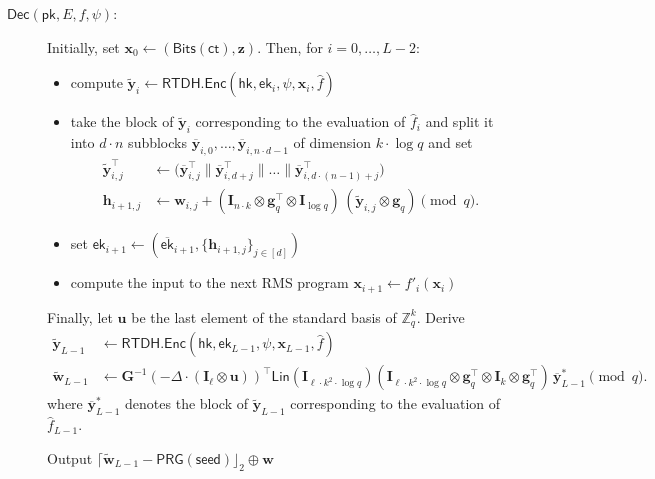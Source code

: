 \documentclass{theoretics}
\newcommand{\ek}{\mathsf{ek}}
\newcommand{\Z}{\mathbb{Z}}
\newcommand{\ct}{\mathsf{ct}}
\newcommand{\RTDH}{\mathsf{RTDH}}
\newcommand{\algofont}[1]{\ensuremath{\mathsf{#1}}}
\newcommand{\Enc}{{\algofont{Enc}}}
\newcommand{\Dec}{{\algofont{Dec}}}
\newcommand{\id}{\ensuremath{\mathbf{I}}}
\newcommand{\pk}{{\mathsf{pk}}}
\newcommand{\hk}{\ensuremath{\mathsf{hk}}}
\newenvironment{protocol}[1][]
{\begin{algorithm}\caption{#1}}
  {\end{algorithm}}
\begin{document}
\begin{protocol}[(cont.)]
\begin{description}
\item[$\Dec(\pk, E, f, \psi)$:]
Initially, set $\mathbf{x}_0\gets (\mathsf{Bits}(\ct), \mathbf{z})$.
Then, for $i=0, \dots, L-2$: 
\begin{itemize}
\item compute $\tilde{\mathbf{y}}_i\gets\RTDH.\Enc(\hk, \ek_i, \psi, \mathbf{x}_i, \hat{f})$
\item take the block of $\tilde{\mathbf{y}}_{i}$ corresponding to the evaluation of $\hat{f}_i$ and split it into $d\cdot n$ subblocks $\overline{\mathbf{y}}_{i, 0}, \dots, \overline{\mathbf{y}}_{i, n\cdot d-1}$ of dimension $k\cdot \log q$ and set
\begin{align*}
\tilde{\mathbf{y}}_{i, j}^\intercal&\gets \bigl(\overline{\mathbf{y}}_{i, j}^\intercal \mathbin{\|} \overline{\mathbf{y}}_{i, d+j}^\intercal \mathbin{\|}\dots \mathbin{\|} \overline{\mathbf{y}}_{i, d\cdot (n-1)+j}^\intercal\bigr)\\
\mathbf{h}_{i+1,j}&\gets \mathbf{w}_{i,j} +(\id_{n\cdot k}\otimes \mathbf{g}_q^\intercal\otimes \id_{\log q})\,(\tilde{\mathbf{y}}_{i,j}\otimes \mathbf{g}_q)\pmod q.\end{align*}
\item set $\ek_{i+1}\gets(\overline{\ek}_{i+1}, \{\mathbf{h}_{i+1, j}\}_{j\in[d]})$
\item compute the input to the next RMS program $\mathbf{x}_{i+1}\gets f'_i(\mathbf{x}_i)$
\end{itemize}
Finally, let $\mathbf{u}$ be the last element of the standard basis of $\Z_q^k$. Derive
\begin{align*}\tilde{\mathbf{y}}_{L-1}&\gets\RTDH.\Enc(\hk, \ek_{L-1}, \psi, \mathbf{x}_{L-1}, \hat{f})\\
\tilde{\mathbf{w}}_{L-1}&\gets \mathbf{G}^{-1}(-\Delta\cdot (\id_\ell\otimes \mathbf u))^\intercal \mathsf{Lin}(\id_{\ell\cdot k^2\cdot \log q}) (\id_{\ell\cdot k^2\cdot \log q}\otimes \mathbf g_q^\intercal\otimes \id_k\otimes \mathbf g_q^\intercal) \,\overline{\mathbf y}_{L-1}^\ast\pmod q.
\end{align*}
where $\overline{\mathbf{y}}_{L-1}^\ast$ denotes the block of $\tilde{\mathbf{y}}_{L-1}$ corresponding to the evaluation of $\hat{f}_{L-1}$.

 Output $\lceil\tilde{\mathbf{w}}_{L-1}-\mathsf{PRG}(\mathsf{seed})\rfloor_2\oplus \mathbf{w}$
\end{description}
\end{protocol}
\end{document}
